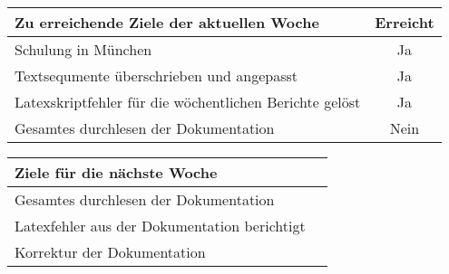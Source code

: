 \begin{tabularx}{\textwidth}{Xc}
    \arrayrulecolor{OliveGreen}
    \toprule
    {\bfseries Zu erreichende Ziele der aktuellen Woche} & {\bfseries Erreicht} \\
    \midrule[2pt]
    Schulung in München                                     &Ja              \\
    \rowcolor{OliveGreen!15}
    Textsequmente überschrieben und angepasst               &Ja              \\
    \rowcolor{White}
    Latexskriptfehler für die wöchentlichen Berichte gelöst &Ja              \\
    \rowcolor{OliveGreen!15}
    Gesamtes durchlesen der Dokumentation                 &Nein              \\
  \bottomrule[2pt]
\end{tabularx}
%
\vspace{1cm}
%
\begin{tabularx}{\textwidth}{Xc}
    \arrayrulecolor{OliveGreen}
    \toprule
    {\bfseries Ziele für die nächste Woche}        &                         \\
    \midrule[2pt]
    Gesamtes durchlesen der Dokumentation          &                         \\
    \rowcolor{OliveGreen!15}
    Latexfehler aus der Dokumentation berichtigt   &                         \\
    \rowcolor{White}
    Korrektur der Dokumentation                    &                         \\
\end{tabularx}
